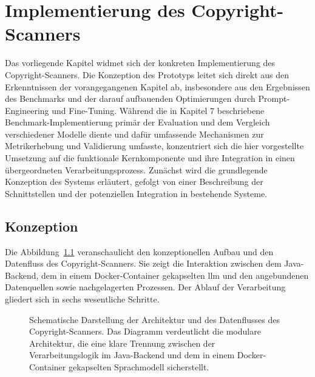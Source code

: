 \chapter{Implementierung des Copyright-Scanners}\label{ch:copyright-scanner}

Das vorliegende Kapitel widmet sich der konkreten Implementierung des Copyright-Scanners.
Die Konzeption des Prototyps leitet sich direkt aus den Erkenntnissen der vorangegangenen Kapitel ab, insbesondere aus den Ergebnissen des Benchmarks und der darauf aufbauenden Optimierungen durch Prompt-Engineering und Fine-Tuning.
Während die in Kapitel 7 beschriebene Benchmark-Implementierung primär der Evaluation und dem Vergleich verschiedener Modelle diente und dafür umfassende Mechanismen zur Metrikerhebung und Validierung umfasste, konzentriert sich die hier vorgestellte Umsetzung auf die funktionale Kernkomponente und ihre Integration in einen übergeordneten Verarbeitungsprozess.
Zunächst wird die grundlegende Konzeption des Systems erläutert, gefolgt von einer Beschreibung der Schnittstellen und der potenziellen Integration in bestehende Systeme.


\section{Konzeption}

Die Abbildung~\ref{fig:copyright-scanner} veranschaulicht den konzeptionellen Aufbau und den Datenfluss des Copyright-Scanners.
Sie zeigt die Interaktion zwischen dem Java-Backend, dem in einem Docker-Container gekapselten \gls{llm} und den angebundenen Datenquellen sowie nachgelagerten Prozessen.
Der Ablauf der Verarbeitung gliedert sich in sechs wesentliche Schritte.

\begin{figure}[ht]
    \centering
    \caption{Schematische Darstellung der Architektur und des Datenflusses des Copyright-Scanners. Das Diagramm verdeutlicht die modulare Architektur, die eine klare Trennung zwischen der Verarbeitungslogik im Java-Backend und dem in einem Docker-Container gekapselten Sprachmodell sicherstellt.}
    \label{fig:copyright-scanner}
\end{figure}

